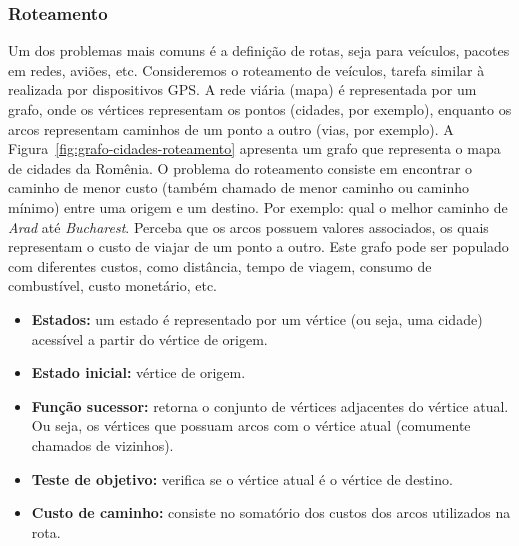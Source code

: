 \subsubsection{Roteamento}

Um dos problemas mais comuns é a definição de rotas, seja para veículos, pacotes em redes, aviões, etc. Consideremos o roteamento de veículos, tarefa similar à realizada por dispositivos GPS. A rede viária (mapa) é representada por um grafo, onde os vértices representam os pontos (cidades, por exemplo), enquanto os arcos representam caminhos de um ponto a outro (vias, por exemplo). A Figura~\ref{fig:grafo-cidades-roteamento} apresenta um grafo que representa o mapa de cidades da Romênia. O problema do roteamento consiste em encontrar o caminho de menor custo (também chamado de menor caminho ou caminho mínimo) entre uma origem e um destino. Por exemplo: qual o melhor caminho de \textit{Arad} até \textit{Bucharest}. Perceba que os arcos possuem valores associados, os quais representam o custo de viajar de um ponto a outro. Este grafo pode ser populado com diferentes custos, como distância, tempo de viagem, consumo de combustível, custo monetário, etc.

\begin{itemize}
	\item \textbf{Estados:} um estado é representado por um vértice (ou seja, uma cidade) acessível a partir do vértice de origem.
	
	\item \textbf{Estado inicial:} vértice de origem.
	
	\item \textbf{Função sucessor:} retorna o conjunto de vértices adjacentes do vértice atual. Ou seja, os vértices que possuam arcos com o vértice atual (comumente chamados de vizinhos).
	
	\item \textbf{Teste de objetivo:} verifica se o vértice atual é o vértice de destino.
	
	\item \textbf{Custo de caminho:} consiste no somatório dos custos dos arcos utilizados na rota.
\end{itemize}

